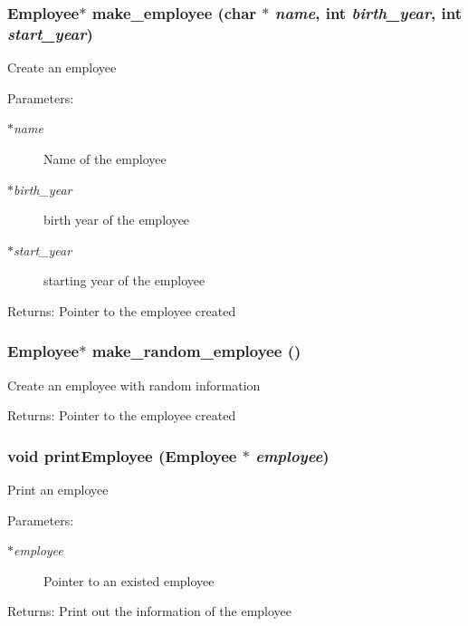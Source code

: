 \subsubsection{\setlength{\rightskip}{0pt plus 5cm}\bf{Employee}$\ast$ make\_\-employee (char $\ast$ {\em name}, int {\em birth\_\-year}, int {\em start\_\-year})}\label{employee_8c_4ec02c0371db62478fa60506c4fee708}


Create an employee \begin{Desc}
\item[Parameters:]
\begin{description}
\item[{\em $\ast$name}]Name of the employee \item[{\em $\ast$birth\_\-year}]birth year of the employee \item[{\em $\ast$start\_\-year}]starting year of the employee \end{description}
\end{Desc}
\begin{Desc}
\item[Returns:]Pointer to the employee created \end{Desc}
\subsubsection{\setlength{\rightskip}{0pt plus 5cm}\bf{Employee}$\ast$ make\_\-random\_\-employee ()}\label{employee_8c_a7772eda2627a2113d449b6fa0d6a848}


Create an employee with random information \begin{Desc}
\item[Returns:]Pointer to the employee created \end{Desc}
\subsubsection{\setlength{\rightskip}{0pt plus 5cm}void print\-Employee (\bf{Employee} $\ast$ {\em employee})}\label{employee_8c_a28c4b8e4929dadc3d00cd55a2469e60}


Print an employee \begin{Desc}
\item[Parameters:]
\begin{description}
\item[{\em $\ast$employee}]Pointer to an existed employee \end{description}
\end{Desc}
\begin{Desc}
\item[Returns:]Print out the information of the employee \end{Desc}

